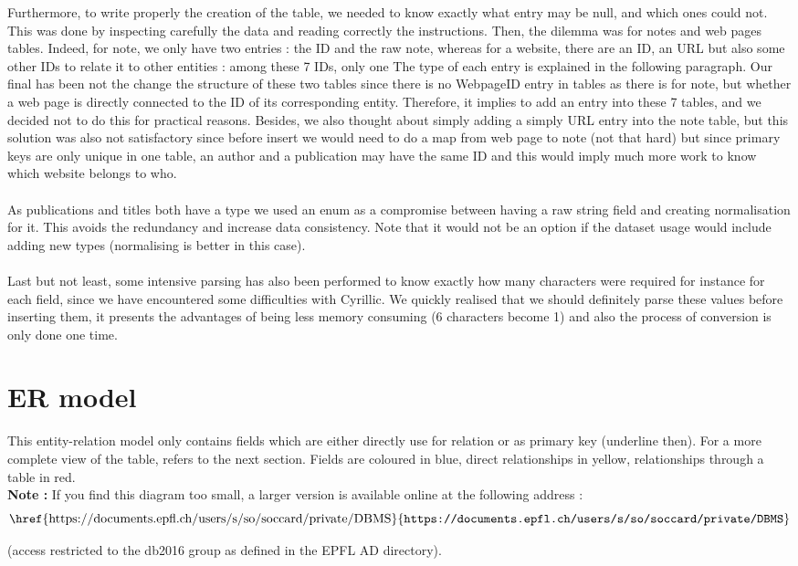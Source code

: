 \documentclass[doubleside, titlepage]{article}
\begin{document}
Furthermore, to write properly the creation of the table, we needed to know exactly what entry may be null, and which ones could not. This was done by inspecting carefully the data and reading correctly the instructions. Then, the dilemma was for notes and web pages tables. Indeed, for note, we only have two entries : the ID and the raw note, whereas for a website, there are an ID, an URL but also some other IDs to relate it to other entities : among these 7 IDs, only one   The type of each entry is explained in the following paragraph. Our final has been not the change the structure of these two tables since there is no WebpageID entry in tables as there is for note, but whether a web page is directly connected to the ID of its corresponding entity. Therefore, it implies to add an entry into these 7 tables, and we decided not to do this for practical reasons. Besides, we also thought about simply adding a simply URL entry into the note table, but this solution was also not satisfactory since before insert we would need to do a map from web page to note (not that hard) but since primary keys are only unique in one table, an author and a publication may have the same ID and this would imply much more work to know which website belongs to who.
~\\~\\
As publications and titles both have a type we used an enum as a compromise between having a raw string field and creating normalisation for it. This avoids the redundancy and increase data consistency. Note that it would not be an option if the dataset usage would include adding new types (normalising is better in this case).
~\\~\\
Last but not least, some intensive parsing has also been performed to know exactly how many characters were required for instance for each field, since we have encountered some difficulties with Cyrillic. We quickly realised that we should definitely parse these values before inserting them, it presents the advantages of being less memory consuming (6 characters become 1) and also the process of conversion is only done one time.
\addtocounter{page}{1}

\section{ER model}

This entity-relation model only contains fields which are either directly use for relation or as primary key (underline then). For a more complete view of the table, refers to the next section. Fields are coloured in blue, direct relationships in yellow, relationships through a table in red.
~\\
\textbf{Note :} If you find this diagram too small, a larger version is available online at the following address :
$$
\text{\href{https://documents.epfl.ch/users/s/so/soccard/private/DBMS}{\texttt{https://documents.epfl.ch/users/s/so/soccard/private/DBMS}}}
$$
\begin{flushright}
(access restricted to the db2016 group as defined in the EPFL AD directory).
\end{flushright}
\end{document}
